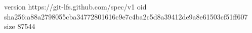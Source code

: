 version https://git-lfs.github.com/spec/v1
oid sha256:a88a2798055cba34772801616c9e7c4ba2c5d8a39412de9a8e61503cf51ff607
size 87544

